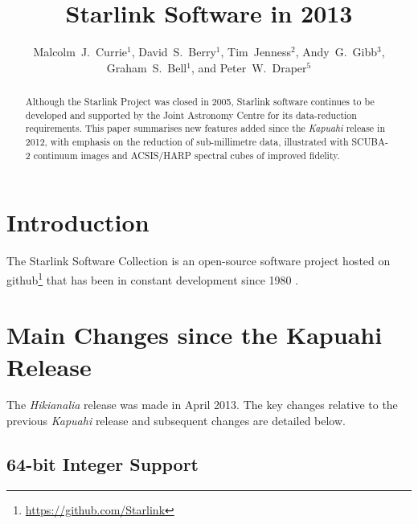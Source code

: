 \documentclass[11pt,twoside]{article}
\begin{document}
\title{Starlink Software in 2013}
\author{Malcolm~J.~Currie$^1$, David~S.~Berry$^1$, Tim~Jenness$^2$,
Andy~G.~Gibb$^3$, Graham~S.~Bell$^1$, and Peter~W.~Draper$^5$
}

\begin{abstract}
  Although the Starlink Project was closed in 2005, Starlink software
  continues to be developed and supported by the Joint Astronomy
  Centre for its data-reduction requirements. This paper summarises
  new features added since the \textit{Kapuahi} release in 2012, with
  emphasis on the reduction of sub-millimetre data, illustrated with
  SCUBA-2 continuum images and ACSIS/HARP spectral cubes of improved
  fidelity.
\end{abstract}

\section{Introduction}

The Starlink Software Collection is an open-source software project
hosted on github\footnote{\url{https://github.com/Starlink}} that has
been in constant development since 1980 \citep{1982QJRAS..23..485D}.

\section{Main Changes since the Kapuahi Release}

The \textit{Hikianalia} release was made in April 2013. The key
changes relative to the previous \textit{Kapuahi} release
\citep{P05_adassxxii} and subsequent changes are detailed below.

\subsection*{64-bit Integer Support}
\end{document}
